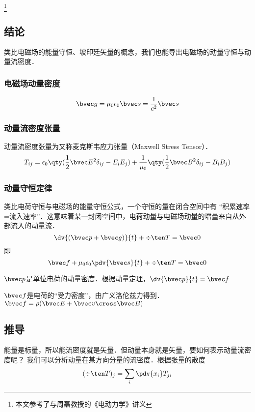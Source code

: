 
\footnote{本文参考了\cite{GriffE}与周磊教授的《电动力学》讲义}
\subsection{结论}
类比电磁场的能量守恒、坡印廷矢量的概念，我们也能导出电磁场的动量守恒与动量流密度．

\subsubsection{电磁场动量密度}
\begin{equation}
\bvec g = \mu_0 \epsilon_0 \bvec s = \frac{1}{c^2} \bvec s 
\end{equation}

\subsubsection{动量流密度张量}
动量流密度张量为又称麦克斯韦应力张量（Maxwell Stress Tensor）．
\begin{equation}\label{EBP_eq2}
T_{ij} = \epsilon_0 \qty(\frac12 \bvec E^2 \delta_{ij} - E_i E_j) + \frac{1}{\mu_0} \qty(\frac12 \bvec B^2 \delta_{ij} - B_i B_j)
\end{equation} 

\subsubsection{动量守恒定律}
类比电荷守恒与电磁场的能量守恒公式，一个守恒的量在闭合空间中有 “积累速率=流入速率”．这意味着某一封闭空间中，电荷动量与电磁场动量的增量来自从外部流入的动量流．
\begin{equation}
\dv{(\bvec p + \bvec g)}{t} + \div \ten T = \bvec 0
\end{equation}
即
\begin{equation}\label{EBP_eq1}
\bvec f  + \mu_0 \epsilon_0 \pdv{\bvec s}{t} + \div \ten T= \bvec 0
\end{equation} 

$\bvec p$是单位电荷的动量密度．根据动量定理，$\dv{\bvec p}{t} = \bvec f$

$\bvec f$是电荷的“受力密度”，由广义洛伦兹力得到．$\bvec f = \rho (\bvec E + \bvec v \cross \bvec B)$

\subsection{推导}	
能量是标量，所以能流密度就是矢量．但动量本身就是矢量，要如何表示动量流密度呢？ 
我们可以分析动量在某方向分量的流密度．根据张量的散度%
\begin{equation}
(\div \ten T)_j = \sum_i \pdv{x_i} T_{ji}
\end{equation}

